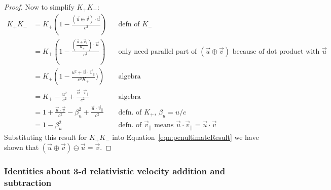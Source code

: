 \documentclass[a4paper]{article}
\theoremstyle{plain}
\theoremstyle{definition}
\newcommand{\vect}[1]{\vec{#1}}
\begin{document}
\begin{proof}
Now to simplify $K_{+}K_{-}$:
\begin{align*}
K_{+}K_{-}
  & = K_{+} \left( 1 - \frac{(\vect{u} \oplus \vect{v}) \cdot \vect{u}}{c^2} \right) & & \text{defn of $K_{-}$} \\
  & = K_{+} \left( 1 - \frac{ (\frac{\vect{u} + \vect{v}_{\parallel}}{K_{+}}) \cdot \vect{u}}{c^2} \right) & & \text{only need parallel part of $(\vect{u} \oplus \vect{v})$ because of dot product with $\vect{u}$} \\
  & = K_{+} \left( 1 - \frac{ u^2 + \vect{u} \cdot \vect{v}_{\parallel}}{c^2 K_{+}}) \right) & & \text{algebra} \\
  & = K_{+} - \frac{u^2}{c^2} + \frac{\vect{u} \cdot \vect{v}_{\parallel}}{c^2} & & \text{algebra} \\
  & = 1 + \frac{\vect{u} \cdot \vect{v}}{c^2} - \beta_u^2 + \frac{\vect{u} \cdot \vect{v}_{\parallel}}{c^2} & & \text{defn. of $K_{+}$, $\beta_u=u/c$} \\
  & = 1 - \beta_u^2 & & \text{defn. of $\vect{v}_{\parallel}$ means $\vect{u} \cdot \vect{v}_{\parallel} = \vect{u} \cdot \vect{v}$}
\end{align*}
Substituting this result for $K_{+}K_{-}$ into
Equation~\eqref{eqn:penultimateResult} we have shown that
$(\vect{u} \oplus \vect{v}) \ominus \vect{u} = \vect{v}$.
\end{proof}


\subsubsection{Identities about 3-d relativistic velocity addition and subtraction}
\label{app:3drelvelocityadd-identities}
\end{document}
